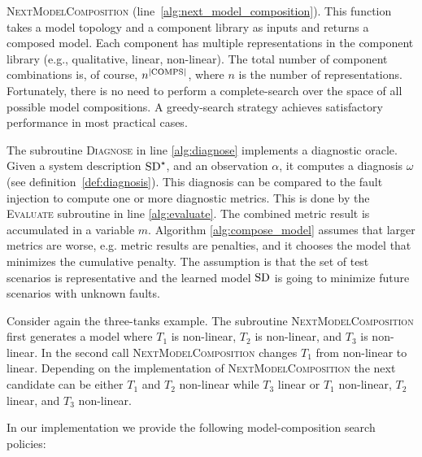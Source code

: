 \textsc{NextModelComposition}
(line~\ref{alg:next_model_composition}). This function takes a model
topology and a component library as inputs and returns a composed
model. Each component has multiple representations in the component
library (e.g., qualitative, linear, non-linear). The total number of
component combinations is, of course, $n^{|\mathrm{COMPS}|}$, where $n$ is the
number of representations. Fortunately, there is no need to perform a
complete-search over the space of all possible model compositions. A
greedy-search strategy achieves satisfactory performance in most
practical cases.
\par
The subroutine \textsc{Diagnose} in line \ref{alg:diagnose} implements
a diagnostic oracle. Given a system description $\mathrm{SD}^\star$, and an
observation $\alpha$, it computes a diagnosis $\omega$ (see
definition~\ref{def:diagnosis}). This diagnosis can be compared to the
fault injection to compute one or more diagnostic metrics. This is
done by the \textsc{Evaluate} subroutine in line
\ref{alg:evaluate}. The combined metric result is accumulated in a variable
$m$. Algorithm \ref{alg:compose_model} assumes that larger metrics are
worse, e.g. metric results are penalties, and it chooses the model
that minimizes the cumulative penalty. The assumption is that the set
of test scenarios is representative and the learned model $\mathrm{SD}$ is
going to minimize future scenarios with unknown faults.
\par
Consider again the three-tanks example. The subroutine
\textsc{NextModelComposition} first generates a model where $T_1$ is
non-linear, $T_2$ is non-linear, and $T_3$ is non-linear. In the second
call \textsc{NextModelComposition} changes $T_1$ from non-linear to
linear. Depending on the implementation of
\textsc{NextModelComposition} the next candidate can be either $T_1$
and $T_2$ non-linear while $T_3$ linear or $T_1$ non-linear, $T_2$
linear, and $T_3$ non-linear.
\par
In our implementation we provide the following model-composition
search policies:
%
